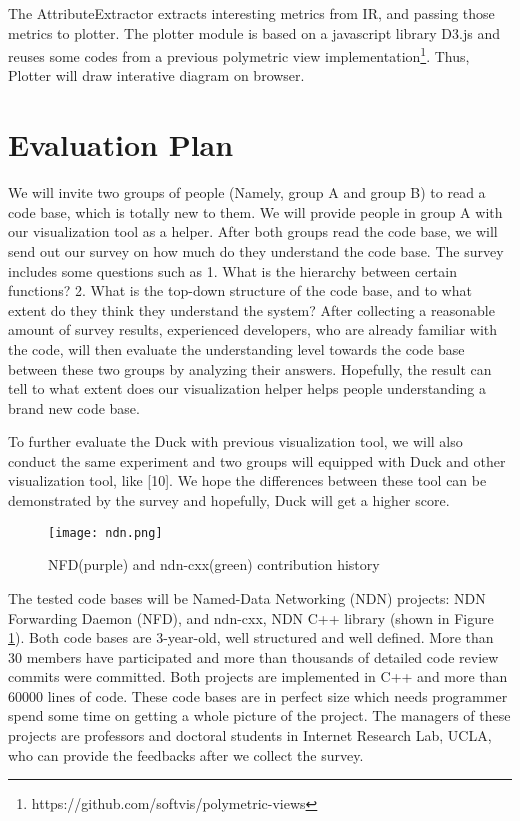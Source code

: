 \documentclass{sig-alternate}
\begin{document}
The AttributeExtractor extracts interesting metrics from IR, and passing those metrics to plotter.
The plotter module is based on a javascript library D3.js and reuses some codes
from a previous polymetric view implementation\footnote{https://github.com/softvis/polymetric-views}.
Thus, Plotter will draw interative diagram on browser.

\section{Evaluation Plan}
We will invite two groups of people (Namely, group A and group B) to read a code base,
which is totally new to them. We will provide people in group A with our visualization
tool as a helper. After both groups read the code base, we will send out our survey on
how much do they understand the code base.
The survey includes some questions such as 1. What is the hierarchy between certain functions?
2. What is the top-down structure of the code base, and to what extent do they think they understand the system?
After collecting a reasonable amount of survey results, experienced developers, who are
already familiar with the code, will then evaluate the understanding level towards the code base
between these two groups by analyzing their answers. Hopefully, the result can tell to what extent does
our visualization helper helps people understanding a brand new code base.

To further evaluate the Duck with previous visualization tool,
we will also conduct the same experiment and two groups will equipped with Duck and other visualization tool, like [10].
We hope the differences between these tool can be demonstrated by the survey and hopefully, Duck will get a higher score.

\begin{figure}
\centering
\texttt{[image: ndn.png]}
\caption{NFD(purple) and ndn-cxx(green) contribution history}
\label{fig:ndn}
\end{figure}

The tested code bases will be Named-Data Networking (NDN) projects\cite{ndn}: NDN Forwarding Daemon (NFD), and ndn-cxx, NDN C++ library (shown in Figure \ref{fig:ndn}).
Both code bases are 3-year-old,
well structured and well defined. More than 30 members have participated and more than thousands of detailed code review commits were committed.
Both projects are implemented in C++ and more than 60000 lines of code.
These code bases are in perfect size which needs programmer spend some time on getting a whole picture of the project.
The managers of these projects are professors and doctoral students in Internet Research Lab, UCLA, who can
provide the feedbacks after we collect the survey.
\end{document}
